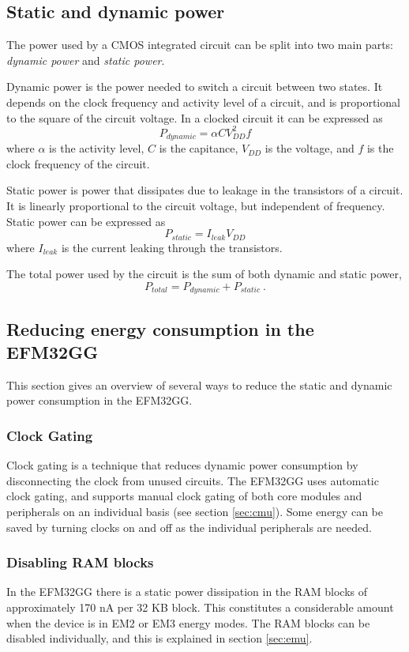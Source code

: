 \subsection{Static and dynamic power}
The power used by a CMOS integrated circuit can be split into two main parts: \emph{dynamic power} and \emph{static power}. 

Dynamic power is the power needed to switch a circuit between two states. It depends on the clock frequency and activity level of a circuit, and is proportional to the square of the circuit voltage. In a clocked circuit it can be expressed as
$$P_{dynamic} = \alpha CV_{DD}^{2}f$$
where $\alpha$ is the activity level, $C$ is the capitance, $V_{DD}$ is the voltage, and $f$ is the clock frequency of the circuit.

Static power is power that dissipates due to leakage in the transistors of a circuit. It is linearly proportional to the circuit voltage, but independent of frequency. Static power can be expressed as
$$P_{static} = I_{leak}V_{DD}$$
where $I_{leak}$ is the current leaking through the transistors.

The total power used by the circuit is the sum of both dynamic and static power,
$$P_{total} = P_{dynamic} + P_{static}\ .$$
\cite{cmos-vlsi-design}


\subsection{Reducing energy consumption in the EFM32GG}
This section gives an overview of several ways to reduce the static and dynamic power consumption in the EFM32GG.

\subsubsection{Clock Gating}
Clock gating is a technique that reduces dynamic power consumption by disconnecting the clock from unused circuits. The EFM32GG uses automatic clock gating, and supports manual clock gating of both core modules and peripherals on an individual basis (see section \ref{sec:cmu}). Some energy can be saved by turning clocks on and off as the individual peripherals are needed.\cite{efm32-energy-optimization} 


\subsubsection{Disabling RAM blocks}
In the EFM32GG there is a static power dissipation in the RAM blocks of approximately 170 nA per 32 KB block. This constitutes a considerable amount when the device is in EM2 or EM3 energy modes. The RAM blocks can be disabled individually, and this is explained in section \ref{sec:emu}.\cite{efm32-energy-optimization}


